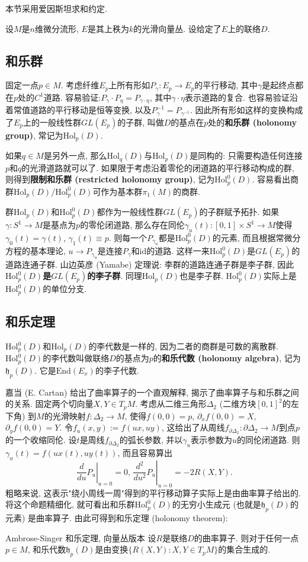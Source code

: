 
本节采用爱因斯坦求和约定.

设$M$是$n$维微分流形, $E$是其上秩为$k$的光滑向量丛. 设给定了$E$上的联络$D$.

\subsection{和乐群}
固定一点$p\in M$. 考虑纤维$E_p$上所有形如$P_\gamma:E_p\to E_p$的平行移动, 其中$\gamma$是起终点都在$p$处的$C^1$道路. 容易验证:$P_\gamma\cdot P_\eta=P_{\gamma\cdot\eta}$,
其中$\gamma\cdot\eta$表示道路的复合. 也容易验证沿着常值道路的平行移动是恒等变换, 以及$P_\gamma^{-1}=P_{\gamma^{-1}}$. 因此所有形如这样的变换构成了$E_p$上的一般线性群$GL(E_p)$的子群, 叫做$D$的基点在$p$处的\textbf{和乐群 (holonomy group)}, 常记为$\text{Hol}_p(D)$. 

如果$q\in M$是另外一点, 那么$\text{Hol}_q(D)$与$\text{Hol}_p(D)$是同构的: 只需要构造任何连接$p$和$q$的光滑道路就可以了. 如果限于考虑沿着零伦的闭道路的平行移动构成的群, 则得到\textbf{限制和乐群 (restricted holonomy group)}, 记为$\text{Hol}^0_p(D)$. 容易看出商群$\text{Hol}_p(D)/\text{Hol}_p^0(D)$可作为基本群$\pi_1(M)$的商群.

群$\text{Hol}_p(D)$和$\text{Hol}_p^0(D)$都作为一般线性群$GL(E_p)$的子群赋予拓扑. 如果$\gamma:S^1\to M$是基点为$p$的零伦闭道路, 那么存在同伦$\gamma_u(t):[0,1]\times S^1\to M$使得$\gamma_0(t)=\gamma(t)$, $\gamma_1(t)\equiv p$. 则每一个$P_{\gamma_u}$都是$\text{Hol}_p^0(D)$的元素, 而且根据常微分方程的基本理论, $u\to P_{\gamma_u}$是连接$P_\gamma$和$\text{id}$的道路. 这样一来$\text{Hol}_p^0(D)$是$GL(E_p)$的道路连通子群. 山边英彦 (Yamabe) 定理说: 李群的道路连通子群是李子群, 因此\textbf{$\text{Hol}_p^0(D)$是$GL(E_p)$的李子群}. 同理$\text{Hol}_p(D)$也是李子群. $\text{Hol}_p^0(D)$实际上是$\text{Hol}_p^0(D)$的单位分支.

\subsection{和乐定理}
$\text{Hol}_p^0(D)$和$\text{Hol}_p(D)$的李代数是一样的, 因为二者的商群是可数的离散群. $\text{Hol}_p^0(D)$的李代数叫做联络$D$的基点为$p$的\textbf{和乐代数 (holonomy algebra)}, 记为$\mathfrak{h}_p(D)$.  它是$\text{End}(E_x)$的李子代数. 

嘉当 (E. Cartan) 给出了曲率算子的一个直观解释, 揭示了曲率算子与和乐群之间的关系. 固定两个切向量$X,Y\in T_pM$. 考虑从二维三角形$\Delta_2$ (二维方块$[0,1]^2$的左下角) 到$M$的光滑映射$f:\Delta_2\to M$, 使得$f(0,0)=p$, $\partial_xf(0,0)=X$, $\partial_yf(0,0)=Y$. 令$f_u(x,y):=f(ux,uy)$, 这给出了从周线$f_{\partial\Delta_2}:\partial\Delta_2\to M$到点$p$的一个收缩同伦. 设$t$是周线$f_{\partial\Delta_2}$的弧长参数, 并以$\gamma_u$表示参数为$u$的同伦闭道路. 则$\gamma_u(t)=f(ux(t),uy(t))$, 而且容易算出
$$
\left.\frac{d}{du}P_u\right|_{u=0}=0,\,\left.\frac{d^2}{du^2}P_u\right|_{u=0}=-2R(X,Y).
$$
粗略来说, 这表示"绕小周线一周"得到的平行移动算子实际上是由曲率算子给出的. 将这个命题精细化, 就可看出和乐群$\text{Hol}_p^0(D)$的无穷小生成元 (也就是$\mathfrak{h}_p(D)$的元素) 是曲率算子. 由此可得到和乐定理 (holonomy theorem):

\begin{theorem}{Ambrose-Singer 和乐定理, 向量丛版本}
设$R$是联络$D$的曲率算子. 则对于任何一点$p\in M$, 和乐代数$\mathfrak{h}_p(D)$是由变换$\{R(X,Y):X,Y\in T_pM\}$的集合生成的.
\end{theorem}